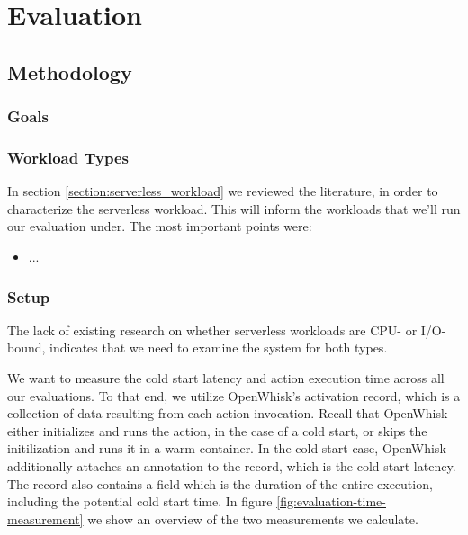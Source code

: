 \chapter{Evaluation}
\label{chapter:evaluation}

\section{Methodology}

\subsection{Goals}


\subsection{Workload Types}

In section \ref{section:serverless_workload} we reviewed the literature, in order to characterize the serverless workload. This will inform the workloads that we'll run our evaluation under. The most important points were:

\begin{itemize}
    \item ...
\end{itemize}

\subsection{Setup}


The lack of existing research on whether serverless workloads are CPU- or I/O-bound, indicates that we need to examine the system for both types.

We want to measure the cold start latency and action execution time across all our evaluations. To that end, we utilize OpenWhisk's activation record, which is a collection of data resulting from each action invocation.  Recall that OpenWhisk either initializes and runs the action, in the case of a cold start, or skips the initilization and runs it in a warm container. In the cold start case, OpenWhisk additionally attaches an  annotation to the record, which is the cold start latency. The record also contains a  field which is the duration of the entire execution, including the potential cold start time. In figure \ref{fig:evaluation-time-measurement} we show an overview of the two measurements we calculate.

